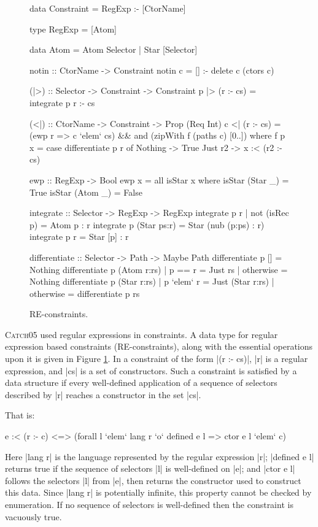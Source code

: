 \documentclass[preprint]{sigplanconf}
\newcommand{\catch}{\textsc{Catch}}
\begin{document}
\begin{figure}
\begin{code}
data Constraint = RegExp :- [CtorName]

type RegExp = [Atom]

data Atom  =  Atom  Selector
           |  Star  [Selector]

notin :: CtorName -> Constraint
notin c = [] :- delete c (ctors c)

(|>) :: Selector -> Constraint -> Constraint
p |> (r :- cs) = integrate p r :- cs

(<|) :: CtorName -> Constraint -> Prop (Req Int)
c <| (r :- cs) = (ewp r => c `elem` cs) &&
    and (zipWith f (paths c) [0..])
    where
    f p x = case  differentiate p r of
                  Nothing -> True
                  Just r2 -> x :< (r2 :- cs)

ewp :: RegExp -> Bool
ewp x = all isStar x
   where  isStar (Star  _) = True
          isStar (Atom  _) = False

integrate :: Selector -> RegExp -> RegExp
integrate p r | not (isRec p) = Atom p : r
integrate p (Star ps:r) = Star (nub (p:ps) : r)
integrate p r = Star [p] : r

differentiate :: Selector -> Path -> Maybe Path
differentiate p [] = Nothing
differentiate p (Atom  r:rs)  | p == r     = Just rs
                              | otherwise  = Nothing
differentiate p (Star  r:rs)  | p `elem` r  = Just (Star r:rs)
                              | otherwise   = differentiate p rs
\end{code}
\caption{RE-constraints.}
\label{fig:regexp}
\end{figure}

\catch05 used regular expressions in constraints. A data type for regular expression based constraints (RE-constraints), along with the essential operations upon it is given in Figure \ref{fig:regexp}. In a constraint of the form |(r :- cs)|, |r| is a regular expression, and |cs| is a set of constructors. Such a constraint is satisfied by a data structure if every well-defined application of a sequence of selectors described by |r| reaches a constructor in the set |cs|.

That is:

\begin{code}
e :< (r :- c) <=> (forall l `elem` lang r `o` defined e l => ctor e l `elem` c)
\end{code}

Here |lang r| is the language represented by the regular expression |r|; |defined e l| returns true if the sequence of selectors |l| is well-defined on |e|; and |ctor e l| follows the selectors |l| from |e|, then returns the constructor used to construct this data. Since |lang r| is potentially infinite, this property cannot be checked by enumeration. If no sequence of selectors is well-defined then the constraint is vacuously true.
\end{document}
